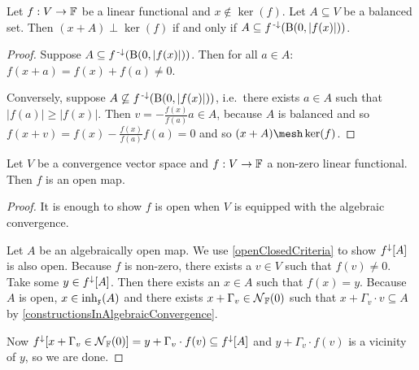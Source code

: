 \begin{lemma} \label{functionalBoundedNeighbourhood}
Let $f: V\to \mathbb{F}$ be a linear functional and $x\notin \ker(f)$. Let $A\subseteq V$ be a balanced set. Then $(x+A)\perp \ker(f)$ \textup{if and only if} $A \subseteq f^{{\text{\hspace{0.15em}-}\downarrow}}(\operatorname{B}(0,|f(x)|))$.
\end{lemma}
\begin{proof}
Suppose $A \subseteq f^{{\text{\hspace{0.15em}-}\downarrow}}(\operatorname{B}(0,|f(x)|))$. Then for all $a\in A$: $f(x+a) = f(x) + f(a) \neq 0$.

Conversely, suppose $A \not\subseteq f^{{\text{\hspace{0.15em}-}\downarrow}}(\operatorname{B}(0,|f(x)|))$, i.e.\ there exists $a\in A$ such that $|f(a)| \geq |f(x)|$. Then $v= -\frac{f(x)}{f(a)}a\in A$, because $A$ is balanced and so $f(x+ v) = f(x)-\frac{f(x)}{f(a)}f(a) = 0$ and so $(x+A) \mesh \ker(f)$.
\end{proof}

\begin{proposition} \label{linearFunctionalOpen}
Let $V$ be a convergence vector space and $f:V\to \mathbb{F}$ a non-zero linear functional. Then $f$ is an open map.
\end{proposition}
\begin{proof}
It is enough to show $f$ is open when $V$ is equipped with the algebraic convergence.

Let $A$ be an algebraically open map. We use \ref{openClosedCriteria} to show $f^\downarrow[A]$ is also open. Because $f$ is non-zero, there exists a $v\in V$ such that $f(v) \neq 0$. Take some $y\in f^\downarrow[A]$. Then there exists an $x\in A$ such that $f(x) = y$. Because $A$ is open, $x\in \operatorname{inh}_\mathfrak{x}(A)$ and there exists $x+ \Gamma_v\in \operatorname{\mathcal{N}}_{\mathbb{F}}(0)$ such that $x+\Gamma_v\cdot v \subseteq A$ by \ref{constructionsInAlgebraicConvergence}.

Now $f^\downarrow[x+ \Gamma_v\in \operatorname{\mathcal{N}}_{\mathbb{F}}(0)] = y+\Gamma_v \cdot f(v) \subseteq f^\downarrow[A]$ and $y+\Gamma_v \cdot f(v)$ is a vicinity of $y$, so we are done.
\end{proof}

